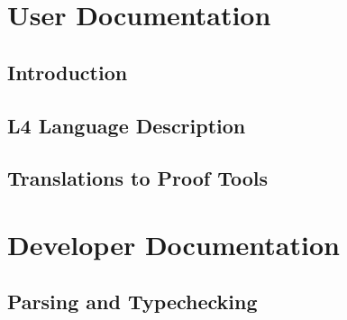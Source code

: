 \documentclass[11pt,a4paper,twoside,headinclude,footexclude]{scrreprt}
\begin{document}




\cleardoublepage


\newpage
\tableofcontents
\listoffigures

\cleardoublepage


\chapter{User Documentation}

\section{Introduction}\label{sec:introduction}



\section{L4 Language Description}\label{sec:language}



\section{Translations to Proof Tools}\label{sec:translations}


\chapter{Developer Documentation}

\section{Parsing and Typechecking}\label{sec:parsing_typechecking}




\newpage


\end{document}
